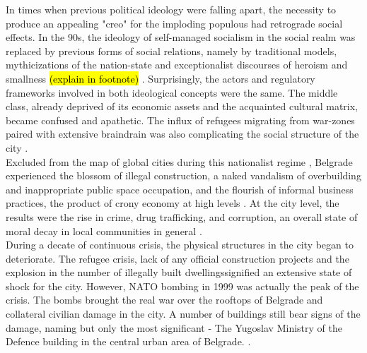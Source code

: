 \documentclass[11pt]{report}
\begin{document}
In times when previous political ideology were falling apart, the necessity to produce an appealing "creo" for the imploding populous had retrograde social effects. In the 90s, the ideology of self-managed socialism in the social realm was replaced by previous forms of social relations, namely by traditional models, mythicizations of the nation-state and exceptionalist discourses of heroism and smallness \hl{(explain in footnote)} \cite{(Savic 2014, Samardzic in Doytchinov 2015)}. Surprisingly, the actors and regulatory frameworks involved in both ideological concepts were the same. The middle class, already deprived of its economic assets and the acquainted cultural matrix, became confused and apathetic.
The influx of refugees migrating from war-zones paired with extensive braindrain was also complicating the social structure of the city \cite{Vanista Lazarevic in Doytchinov 2015}.
\\
Excluded from the map of global cities during this nationalist regime , Belgrade experienced the blossom of illegal construction, a naked vandalism of overbuilding and inappropriate public space occupation, and the flourish of informal business practices, the product of crony economy at high levels \cite{ref}. At the city level, the results were the rise in crime, drug trafficking, and corruption, an overall state of moral decay in local communities in general \cite{(Prodanovic Stariji i lepsi Beograd)}.
\\
During a decate of continuous crisis, the physical structures in the city began to deteriorate. The refugee crisis, lack of any official construction projects and the explosion in the number of illegally built dwellings\footnotemark signified an extensive state of shock for the city. However, NATO bombing in 1999 was actually the peak of the crisis. The bombs brought the real war over the rooftops of Belgrade and collateral civilian damage in the city. A number of buildings still bear signs of the damage, naming but only the most significant - The Yugoslav Ministry of the Defence building in the central urban area of Belgrade.\footnotemark 
{}.
\end{document}
